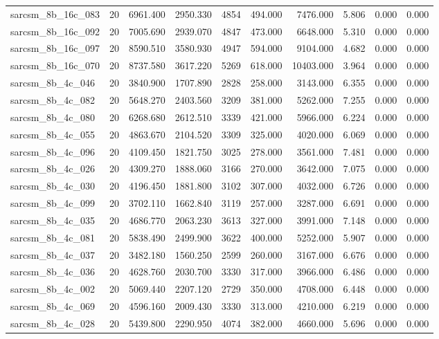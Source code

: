 \begin{tabular}{lrrrrrrrrr}
sarcsm\_8b\_16c\_083 & 20 & 6961.400 & 2950.330 & 4854 & 494.000 & 7476.000 & 5.806 & 0.000 & 0.000 \\
sarcsm\_8b\_16c\_092 & 20 & 7005.690 & 2939.070 & 4847 & 473.000 & 6648.000 & 5.310 & 0.000 & 0.000 \\
sarcsm\_8b\_16c\_097 & 20 & 8590.510 & 3580.930 & 4947 & 594.000 & 9104.000 & 4.682 & 0.000 & 0.000 \\
sarcsm\_8b\_16c\_070 & 20 & 8737.580 & 3617.220 & 5269 & 618.000 & 10403.000 & 3.964 & 0.000 & 0.000 \\
sarcsm\_8b\_4c\_046 & 20 & 3840.900 & 1707.890 & 2828 & 258.000 & 3143.000 & 6.355 & 0.000 & 0.000 \\
sarcsm\_8b\_4c\_082 & 20 & 5648.270 & 2403.560 & 3209 & 381.000 & 5262.000 & 7.255 & 0.000 & 0.000 \\
sarcsm\_8b\_4c\_080 & 20 & 6268.680 & 2612.510 & 3339 & 421.000 & 5966.000 & 6.224 & 0.000 & 0.000 \\
sarcsm\_8b\_4c\_055 & 20 & 4863.670 & 2104.520 & 3309 & 325.000 & 4020.000 & 6.069 & 0.000 & 0.000 \\
sarcsm\_8b\_4c\_096 & 20 & 4109.450 & 1821.750 & 3025 & 278.000 & 3561.000 & 7.481 & 0.000 & 0.000 \\
sarcsm\_8b\_4c\_026 & 20 & 4309.270 & 1888.060 & 3166 & 270.000 & 3642.000 & 7.075 & 0.000 & 0.000 \\
sarcsm\_8b\_4c\_030 & 20 & 4196.450 & 1881.800 & 3102 & 307.000 & 4032.000 & 6.726 & 0.000 & 0.000 \\
sarcsm\_8b\_4c\_099 & 20 & 3702.110 & 1662.840 & 3119 & 257.000 & 3287.000 & 6.691 & 0.000 & 0.000 \\
sarcsm\_8b\_4c\_035 & 20 & 4686.770 & 2063.230 & 3613 & 327.000 & 3991.000 & 7.148 & 0.000 & 0.000 \\
sarcsm\_8b\_4c\_081 & 20 & 5838.490 & 2499.900 & 3622 & 400.000 & 5252.000 & 5.907 & 0.000 & 0.000 \\
sarcsm\_8b\_4c\_037 & 20 & 3482.180 & 1560.250 & 2599 & 260.000 & 3167.000 & 6.676 & 0.000 & 0.000 \\
sarcsm\_8b\_4c\_036 & 20 & 4628.760 & 2030.700 & 3330 & 317.000 & 3966.000 & 6.486 & 0.000 & 0.000 \\
sarcsm\_8b\_4c\_002 & 20 & 5069.440 & 2207.120 & 2729 & 350.000 & 4708.000 & 6.448 & 0.000 & 0.000 \\
sarcsm\_8b\_4c\_069 & 20 & 4596.160 & 2009.430 & 3330 & 313.000 & 4210.000 & 6.219 & 0.000 & 0.000 \\
sarcsm\_8b\_4c\_028 & 20 & 5439.800 & 2290.950 & 4074 & 382.000 & 4660.000 & 5.696 & 0.000 & 0.000 \\

\end{tabular}
